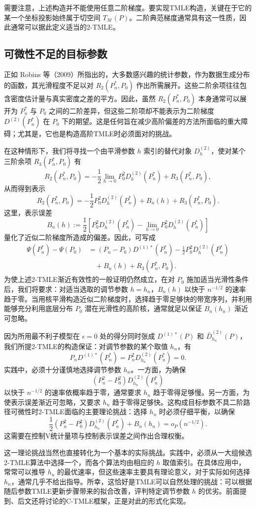 需要注意，上述构造并不能使用任意二阶梯度。要实现TMLE构造，关键在于它的某一个坐标投影始终属于切空间 $T_{\mathcal M}(P)$。二阶典范梯度通常具有这一性质，因此通常可以据此定义适当的2-TMLE。

\subsection{可微性不足的目标参数}

正如 Robins 等（2009）所指出的，大多数感兴趣的统计参数，作为数据生成分布的函数，其光滑程度不足以对 $R_2(P_n^*,P_0)$ 作出所需展开。这些二阶余项往往包含密度估计量与真实密度之差的平方。因此，虽然 $R_2(P_n^*,P_0)$ 本身通常可以展开为 $P_n^*$ 与 $P_0$ 之间的二阶差异，但这些二阶项却不能表示为二阶梯度 $D^{(2)}(P_n^*)$ 在 $P_0$ 下的期望。这是任何旨在减少高阶偏差的方法所面临的重大障碍；尤其是，它也是构造高阶TMLE时必须面对的挑战。

在这种情形下，我们将寻找一个由平滑参数 $h$ 索引的替代对象 $D_h^{(2)}$，使对某个三阶余项 $R_3(P_n^*,P_0)$ 有
\[
R_2(P_n^*,P_0)=-\frac12\lim_{h\to0}P_0^2D_h^{(2)}(P_n^*)+R_3(P_n^*,P_0),
\]
从而得到表示
\[
R_2(P_n^*,P_0)=-\frac12P_0^2D_h^{(2)}(P_n^*)+B_n(h)+R_3(P_n^*,P_0).
\]
这里，表示误差
\[
B_n(h):=\frac12\left[P_0^2D_h^{(2)}(P_n^*)-\lim_{h\to0}P_0^2D_h^{(2)}(P_n^*)\right]
\]
量化了近似二阶梯度所造成的偏差。因此，可写成
\[
\begin{aligned}
\Psi(P_n^*)-\Psi(P_0)
 &= (P_n-P_0)D^{(1)*}(P_n^*)-\frac12P_0^2D_h^{(2)}(P_n^*)\\
 &\quad+B_n(h)+R_3(P_n^*,P_0).
\end{aligned}
\]
为使上述2-TMLE渐近有效性的一般证明仍然成立，在对 $P_0$ 施加适当光滑性条件后，我们将要求：对适当选取的调节参数 $h=h_n$，$B_n(h)$ 以快于 $n^{-1/2}$ 的速率趋于零。当用核平滑构造近似二阶梯度时，选择趋于零足够快的带宽序列，并利用能够充分利用底层分布 $P_0$ 潜在光滑性的高阶核，通常就足以保证 $B_n(h_n)$ 渐近可忽略。

因为所用最不利子模型在 $\epsilon=0$ 处的得分同时张成 $D^{(1)*}(P)$ 和 $\bar D_{h_n}^{(2)}(P)$，我们所提2-TMLE的构造保证：对调节参数的某个取值 $h_n$，有
\[
P_nD^{(1)*}(P_n^*)=P_n^2D_{h_n}^{(2)}(P_n^*)=0.
\]
实践中，必须十分谨慎地选择调节参数 $h_n$。一方面，为确保
\[
(P_n^2-P_0^2)D_{h_n}^{(2)}(P_n^*)
\]
以快于 $n^{-1/2}$ 的速率依概率趋于零，通常要求 $h_n$ 趋于零得足够慢。另一方面，为使表示误差渐近可忽略，又要求 $h_n$ 趋于零得足够快。这构成目标参数不具二阶路径可微性时2-TMLE面临的主要理论挑战：选择 $h_n$ 时必须仔细平衡，以确保
\[
\frac12(P_n^2-P_0^2)D_{h_n}^{(2)}(P_n^*)+B_n(h_n)=o_P(n^{-1/2}).
\]
这需要在控制V统计量项与控制表示误差之间作出合理权衡。

这一理论挑战当然也直接转化为一个基本的实际挑战。实践中，必须从一大组候选2-TMLE算法中选择一个，而各个算法均由相应的 $h$ 取值索引。在具体应用中，常常可以推导 $h_n$ 的最优速率，但这些速率主要具有理论意义，对于实际如何选择 $h_n$，通常几乎不给出指导。所幸，这恰好是TMLE可以自然处理的挑战：可以根据随后参数TMLE更新步骤带来的拟合改善，评判特定调节参数 $h$ 的优劣。前面提到、后文还将讨论的C-TMLE框架，正是对此的形式化实现。
